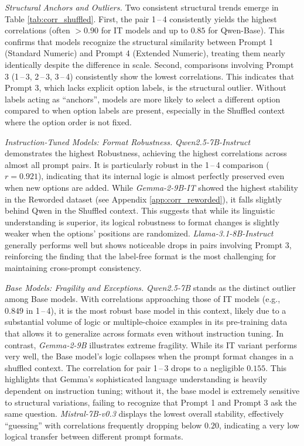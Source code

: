 \textit{Structural Anchors and Outliers.}
Two consistent structural trends emerge in Table \ref{tab:corr_shuffled}.
First, the pair 1\,--\,4 consistently yields the highest correlations (often $>0.90$ for IT models and up to $0.85$ for Qwen-Base). This confirms that models recognize the structural similarity between Prompt 1 (Standard Numeric) and Prompt 4 (Extended Numeric), treating them nearly identically despite the difference in scale.
Second, comparisons involving Prompt 3 (1\,--\,3, 2\,--\,3, 3\,--\,4) consistently show the lowest correlations. This indicates that Prompt 3, which lacks explicit option labels, is the structural outlier. Without labels acting as ``anchors'', models are more likely to select a different option compared to when option labels are present, especially in the Shuffled context where the option order is not fixed.

\textit{Instruction-Tuned Models: Format Robustness.}
\textit{Qwen2.5-7B-Instruct} demonstrates the highest Robustness, achieving the highest correlations across almost all prompt pairs. It is particularly robust in the 1\,--\,4 comparison ($r=0.921$), indicating that its internal logic is almost perfectly preserved even when new options are added.
While \textit{Gemma-2-9B-IT} showed the highest stability in the Reworded dataset (see Appendix \ref{app:corr_reworded}), it falls slightly behind Qwen in the Shuffled context. This suggests that while its linguistic understanding is superior, its logical robustness to format changes is slightly weaker when the options' positions are randomized. \textit{Llama-3.1-8B-Instruct} generally performs well but shows noticeable drops in pairs involving Prompt 3, reinforcing the finding that the label-free format is the most challenging for maintaining cross-prompt consistency.

\textit{Base Models: Fragility and Exceptions.}
\textit{Qwen2.5-7B} stands as the distinct outlier among Base models. With correlations approaching those of IT models (e.g., $0.849$ in 1\,--\,4), it is the most robust base model in this context, likely due to a substantial volume of logic or multiple-choice examples in its pre-training data that allows it to generalize across formats even without instruction tuning.
In contrast, \textit{Gemma-2-9B} illustrates extreme fragility. While its IT variant performs very well, the Base model's logic collapses when the prompt format changes in a shuffled context. The correlation for pair 1\,--\,3 drops to a negligible $0.155$. This highlights that Gemma's sophisticated language understanding is heavily dependent on instruction tuning; without it, the base model is extremely sensitive to structural variations, failing to recognize that Prompt 1 and Prompt 3 ask the same question. \textit{Mistral-7B-v0.3} displays the lowest overall stability, effectively ``guessing'' with correlations frequently dropping below $0.20$, indicating a very low logical transfer between different prompt formats.

